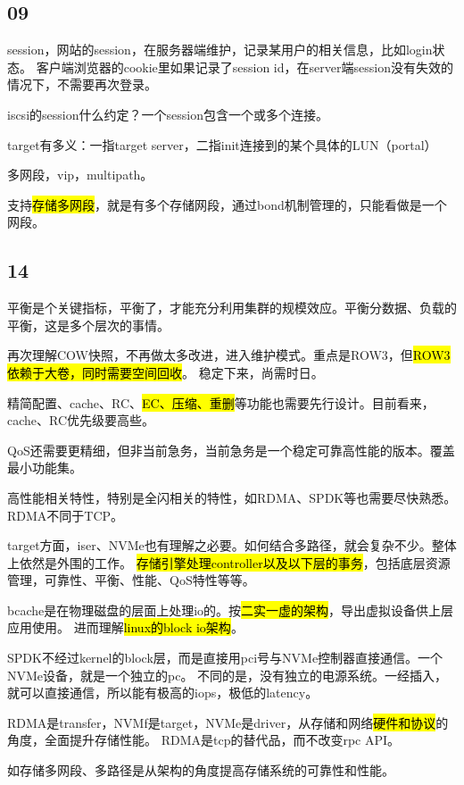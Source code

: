 \subsection{09}

session，网站的session，在服务器端维护，记录某用户的相关信息，比如login状态。
客户端浏览器的cookie里如果记录了session id，在server端session没有失效的情况下，不需要再次登录。

iscsi的session什么约定？一个session包含一个或多个连接。

target有多义：一指target server，二指init连接到的某个具体的LUN（portal）

多网段，vip，multipath。

支持\hl{存储多网段}，就是有多个存储网段，通过bond机制管理的，只能看做是一个网段。

\subsection{14}

平衡是个关键指标，平衡了，才能充分利用集群的规模效应。平衡分数据、负载的平衡，这是多个层次的事情。

再次理解COW快照，不再做太多改进，进入维护模式。重点是ROW3，但\hl{ROW3依赖于大卷，同时需要空间回收}。
稳定下来，尚需时日。

精简配置、cache、RC、\hl{EC、压缩、重删}等功能也需要先行设计。目前看来，cache、RC优先级要高些。

QoS还需要更精细，但非当前急务，当前急务是一个稳定可靠高性能的版本。覆盖最小功能集。

高性能相关特性，特别是全闪相关的特性，如RDMA、SPDK等也需要尽快熟悉。RDMA不同于TCP。

target方面，iser、NVMe也有理解之必要。如何结合多路径，就会复杂不少。整体上依然是外围的工作。
\hl{存储引擎处理controller以及以下层的事务}，包括底层资源管理，可靠性、平衡、性能、QoS特性等等。

bcache是在物理磁盘的层面上处理io的。按\hl{二实一虚的架构}，导出虚拟设备供上层应用使用。
进而理解\hl{linux的block io架构}。

SPDK不经过kernel的block层，而是直接用pci号与NVMe控制器直接通信。一个NVMe设备，就是一个独立的pc。
不同的是，没有独立的电源系统。一经插入，就可以直接通信，所以能有极高的iops，极低的latency。

RDMA是transfer，NVMf是target，NVMe是driver，从存储和网络\hl{硬件和协议}的角度，全面提升存储性能。
RDMA是tcp的替代品，而不改变rpc API。

如存储多网段、多路径是从架构的角度提高存储系统的可靠性和性能。

